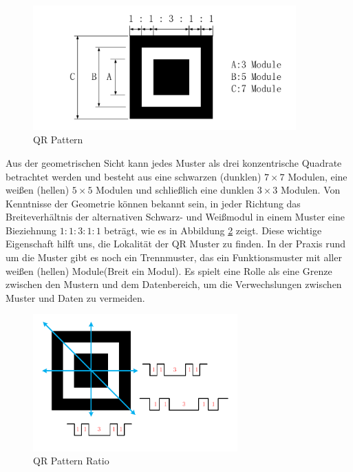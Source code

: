 \begin{figure}[H]
 \centering 
 \includegraphics[keepaspectratio,width=0.9\textwidth]{images/4_ZweiteErfahrung/QRMuster/QRPattern.pdf}
 \caption{QR Pattern}
 \label{fig:QRPattern}
\end{figure}

Aus der geometrischen Sicht kann jedes Muster als drei konzentrische Quadrate betrachtet werden und besteht aus eine schwarzen (dunklen) $7 \times 7$ Modulen, eine weißen (hellen) $5 \times 5$ Modulen und schließlich eine dunklen $3 \times 3$ Modulen. Von Kenntnisse der Geometrie können bekannt sein, in jeder Richtung das Breiteverhältnis der alternativen Schwarz- und Weißmodul in einem Muster eine Bieziehnung $1:1:3:1:1$ beträgt, wie es in Abbildung \ref{fig:QRPatternRatio} zeigt. Diese wichtige Eigenschaft hilft uns, die Lokalität der QR Muster zu finden. In der Praxis rund um die Muster gibt es noch ein Trennmuster, das ein Funktionsmuster mit aller weißen (hellen) Module(Breit ein Modul). Es spielt eine Rolle als eine Grenze zwischen den Mustern und dem Datenbereich, um die Verwechslungen zwischen Muster und Daten zu vermeiden.
 
 \begin{figure}[H]
 \centering 
 \includegraphics[keepaspectratio,width=0.7\textwidth]{images/4_ZweiteErfahrung/QRMuster/QP_Patternratio.pdf}
 \caption{QR Pattern Ratio}
 \label{fig:QRPatternRatio}
\end{figure}

